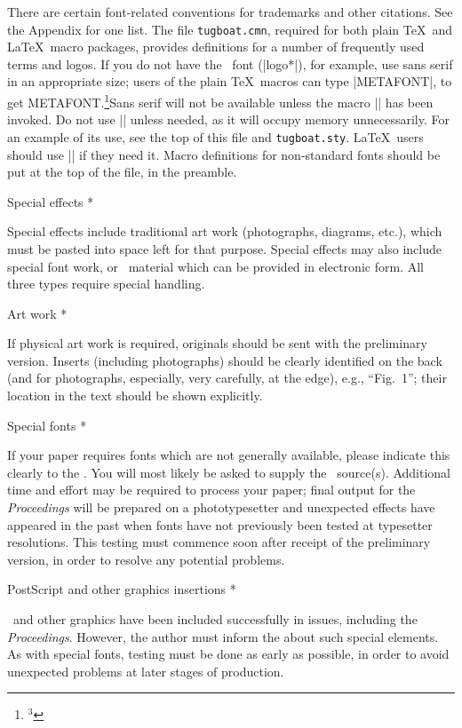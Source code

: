 \item There are certain font-related conventions for trademarks and
   other citations.  See the Appendix for one list. The file
   {\tt tugboat.cmn}, required for both plain \TeX\ and \LaTeX\ macro
   packages, provides definitions for a number of frequently used terms
   and logos.  If you do not have the \MF\ font (|logo*|), for example,
   use sans serif in an appropriate size; users of the plain \TeX\
   macros can type |{\niness METAFONT}|, to get {\niness
   METAFONT}.\footnote{$^3$}{Sans serif will not
   be available unless the macro |\LoadSansFonts| has been invoked.
   Do not use |\LoadSansFonts| unless needed, as it will occupy memory
   unnecessarily. For an example of its use, see the top of this file
   and {\tt tugboat.sty}.} \LaTeX\ users should use |\sf| if they need it.
   Macro definitions for non-standard fonts should
   be put at the top of the file, in the preamble.
\endlist

\head * Special effects *

Special effects include traditional art work (photographs, diagrams,
etc.), which must be pasted into space left for that purpose.  Special
effects may also include special font work, or \PS\ material which can
be provided in electronic form.  All three types require special
handling.

\subhead * Art work *

If physical art work is required,
originals should be sent with the preliminary version.
Inserts (including photographs) should be clear\-ly identified on the
back (and for photographs, especially, very carefully, at the edge),
e.g., ``Fig.~1''; their location in the text should be shown
explicitly.

\subhead * Special fonts *

If your paper requires fonts which are not generally available, please
indicate this clearly to the \editor.  You will most likely be asked to
supply the \MF\ source(s).  Additional time and effort may be required
to process your paper; final output for the {\sl Proceedings\/} will be
prepared on a phototypesetter and unexpected effects have appeared in
the past when fonts have not previously been tested at typesetter
resolutions.  This testing must commence soon after receipt of the
preliminary version, in order to resolve any potential problems.

\subhead * PostScript and other graphics inser\-tions *

\PS\ and other graphics have been included successfully in \TUB\/ issues,
including the {\sl Proceedings}.  However, the author must inform the
\editor{} about such special elements.  As with special fonts, testing
must be done as early as possible, in order to avoid unexpected problems
at later stages of production.


